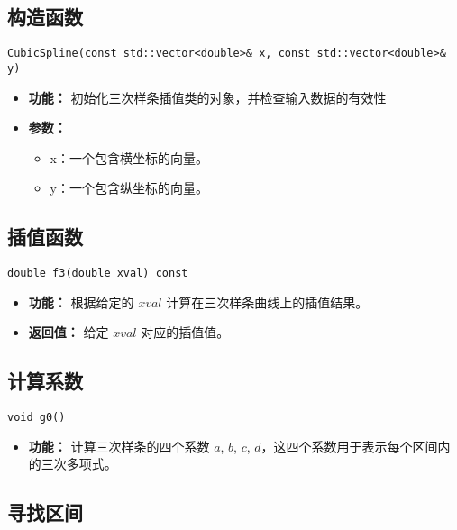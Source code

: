 \documentclass[a4paper]{article}
\begin{document}
\subsection{构造函数}
\begin{verbatim}
CubicSpline(const std::vector<double>& x, const std::vector<double>& y)
\end{verbatim}
\begin{itemize}
    \item \textbf{功能：} 初始化三次样条插值类的对象，并检查输入数据的有效性
    \item \textbf{参数：} 
    \begin{itemize}
        \item x：一个包含横坐标的向量。
        \item y：一个包含纵坐标的向量。
    \end{itemize}
\end{itemize}

\subsection{插值函数}

\begin{verbatim}
double f3(double xval) const
\end{verbatim}

\begin{itemize}
    \item \textbf{功能：} 根据给定的 \( xval \) 计算在三次样条曲线上的插值结果。
    \item \textbf{返回值：} 给定 \( xval \) 对应的插值值。
\end{itemize}

\subsection{计算系数}

\begin{verbatim}
void g0()
\end{verbatim}

\begin{itemize}
    \item \textbf{功能：} 计算三次样条的四个系数 \( a \), \( b \), \( c \), \( d \)，这四个系数用于表示每个区间内的三次多项式。
\end{itemize}

\subsection{寻找区间}
\end{document}
